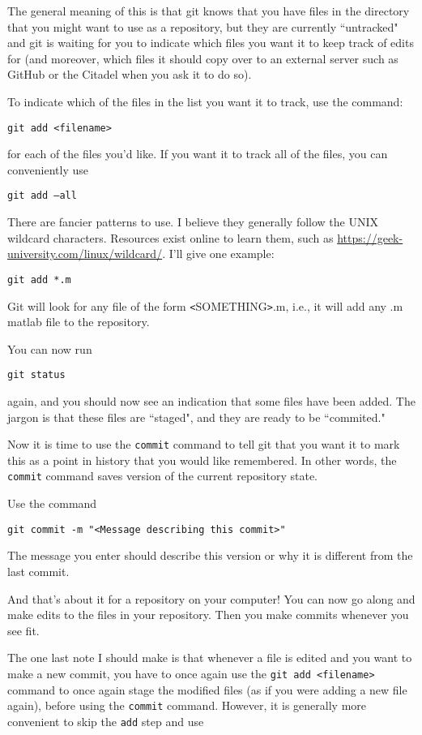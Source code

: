 \documentclass[11pt]{article}
\newcommand{\code}[1]{\quad \texttt{#1}}
\begin{document}
The general meaning of this is that git knows that you have files in the directory that you might want to use as a repository, but they are currently ``untracked" and git is waiting for you to indicate which files you want it to keep track of edits for (and moreover, which files it should copy over to an external server such as GitHub or the Citadel when you ask it to do so).

To indicate which of the files in the list you want it to track, use the command:

\quad \texttt{git add <filename>}

for each of the files you'd like.  If you want it to track all of the files, you can conveniently use

\quad \texttt{git add --all}

There are fancier patterns to use.  I believe they generally follow the UNIX wildcard characters.  Resources exist online to learn them, such as \url{https://geek-university.com/linux/wildcard/}.  I'll give one example:

 \quad \texttt{git add *.m}
 
 Git will look for any file of the form \texttt{<}SOMETHING\texttt{>}.m, i.e., it will add any .m matlab file to the repository.
 
 You can now run 
 
 \quad \texttt{git status}
 
 again, and you should now see an indication that some files have been added.  The jargon is that these files are ``staged", and they are ready to be ``commited."
 
 Now it is time to use the \texttt{commit} command to tell git that you want it to mark this as a point in history that you would like remembered.  In other words, the \texttt{commit} command saves version of the current repository state.  
 
 Use the command
 
 \code{git commit -m "<Message describing this commit>"}

The message you enter should describe this version or why it is different from the last commit.

And that's about it for a repository on your computer!  You can now go along and make edits to the files in your repository.  Then you make commits whenever you see fit.  

The one last note I should make is that whenever a file is edited and you want to make a new commit, you have to once again use the \texttt{git add <filename>} command to once again stage the modified files (as if you were adding a new file again), before using the \texttt{commit} command.  However, it is generally more convenient to skip the \texttt{add} step and use
\end{document}
